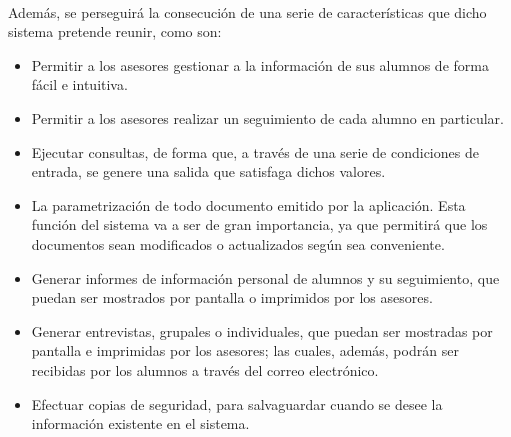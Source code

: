\paragraph{}Además, se perseguirá la consecución de una serie de
características que dicho sistema pretende reunir, como son:

\begin{itemize}
   \item Permitir a los asesores gestionar a la información de sus alumnos de
         forma fácil e intuitiva.
   \item Permitir a los asesores realizar un seguimiento de cada alumno en
         particular.
   \item Ejecutar consultas, de forma que, a través de una serie de condiciones
         de entrada, se genere una salida que satisfaga dichos valores.
   \item La parametrización de todo documento emitido por la aplicación. Esta
         función del sistema va a ser de gran importancia, ya que permitirá que
         los documentos sean modificados o actualizados según sea conveniente.
   \item Generar informes de información personal de alumnos y su seguimiento,
         que puedan ser mostrados por pantalla o imprimidos por los asesores.
   \item Generar entrevistas, grupales o individuales, que puedan ser mostradas
         por pantalla e imprimidas por los asesores; las cuales, además, podrán
         ser recibidas por los alumnos a través del correo electrónico.
   \item Efectuar copias de seguridad, para salvaguardar cuando se desee la
         información existente en el sistema.
\end{itemize}